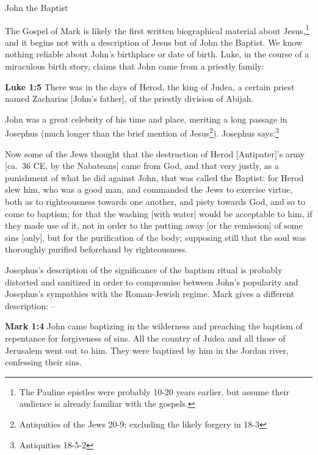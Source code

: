 \documentclass[10pt,twoside]{article} %
\newcommand{\quotesize}{\normalsize{}}
\newcommand{\comm}[1]{\begingroup \color{black!50} #1\endgroup}
\newenvironment{quotetext}{\begingroup\quotesize}{\endgroup}
\newcommand{\bible}[2]{\begin{quotetext}\textbf{#1} #2\end{quotetext}}
\newcommand{\gospelmark}[2]{\bible{Mark #1}{#2}}
\newcommand{\luke}[2]{\bible{Luke #1}{#2}}
\begin{document}
\begin{section}{John the Baptist}

\comm{The Gospel of Mark is likely the first written biographical material about Jesus,\footnote{The Pauline epistles were probably 10-20 years
earlier, but assume their audience is already familiar with the gospels.}
and it begins not with a description of Jesus but of John the Baptist.
We know nothing reliable about John's birthplace or date of birth. Luke, in the course of a miraculous birth story, claims that
John came from a priestly family:}



\luke{1:5}{There was in the days of Herod, the king of Judea, a certain priest named Zacharias [John's father], of the priestly division of Abijah.}

\comm{
John was a great celebrity of his time and place, meriting a long passage in
Josephus (much longer than the brief mention of Jesus\footnote{Antiquities of the Jews 20-9;
excluding the likely forgery in 18-3}).
Josephus says:\footnote{Antiquities 18-5-2} %
}

\begin{quotetext}
Now some of the Jews thought that the destruction of Herod [Antipater]'s army [ca.~36 CE, by the Nabateans] came
from God, and that very justly, as a punishment of what he did against
John, that was called the Baptist: for Herod slew him, who was a good
man, and commanded the Jews to exercise virtue, both as to
righteousness towards one another, and piety towards God, and so to
come to baptism; for that the washing [with water] would be acceptable
to him, if they made use of it, not in order to the putting away [or
the remission] of some sins [only], but for the purification of the
body; supposing still that the soul was thoroughly purified beforehand
by righteousness.
\end{quotetext}

\comm{
Josephus's description of the significance of the baptism ritual is probably
distorted and sanitized in order to compromise between John's popularity and Josephus's sympathies
with the Roman-Jewish regime. Mark gives a different description: --
}

\gospelmark{1:4}{John came baptizing in the wilderness and preaching the
baptism of repentance for forgiveness of sins.  All the country of
Judea and all those of Jerusalem went out to him. They were baptized
by him in the Jordan river, confessing their sins.}


\end{section}
\end{document}

